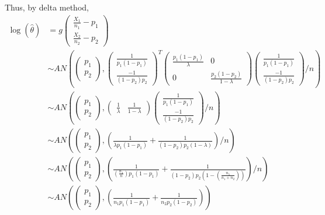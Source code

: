 \documentclass[
  letterpaper,
  DIV=11,
  numbers=noendperiod]{scrreprt}
\begin{document}
Thus, by delta method, \[\begin{aligned}
\log(\hat \theta) &= g \begin{pmatrix} \frac{X_1}{n_1} - p_1 \\ \frac{X_2}{n_2} - p_2 \end{pmatrix} \\
&\sim AN \left( \begin{pmatrix} p_1 \\ p_2 \end{pmatrix},\begin{pmatrix} \frac{1}{p_1(1-p_1)} \\ \frac{-1}{(1-p_2)p_2}\end{pmatrix}^T \begin{pmatrix} \frac{p_1 \left(1 - p_1 \right)}{\lambda} & 0 \\
0 &  \frac{p_2 \left(1 - p_2 \right)}{1-\lambda} \end{pmatrix} \begin{pmatrix} \frac{1}{p_1(1-p_1)} \\ \frac{-1}{(1-p_2)p_2}\end{pmatrix}/n\right) \\
&\sim AN \left( \begin{pmatrix} p_1 \\ p_2 \end{pmatrix},\begin{pmatrix} \frac{1}{\lambda} & \frac{1}{1-\lambda}  \end{pmatrix} \begin{pmatrix} \frac{1}{p_1(1-p_1)} \\ \frac{-1}{(1-p_2)p_2}\end{pmatrix}/n\right)\\
&\sim AN \left( \begin{pmatrix} p_1 \\ p_2 \end{pmatrix},\left( \frac{1}{\lambda p_1(1-p_1)} + \frac{1}{(1-p_2)p_2 (1-\lambda)}\right)/n\right)\\
&\sim AN \left( \begin{pmatrix} p_1 \\ p_2 \end{pmatrix},\left( \frac{1}{\left(\frac{n_1}{n}\right) p_1(1-p_1)} + \frac{1}{(1-p_2)p_2 \left(1-\left(\frac{n_1}{n_1+n_2}\right)\right)}\right)/n\right)\\
&\sim AN \left( \begin{pmatrix} p_1 \\ p_2 \end{pmatrix},\left( \frac{1}{n_1 p_1(1-p_1)} + \frac{1}{n_2p_2(1-p_2) }\right)\right)\\
\end{aligned}\]
\end{document}
